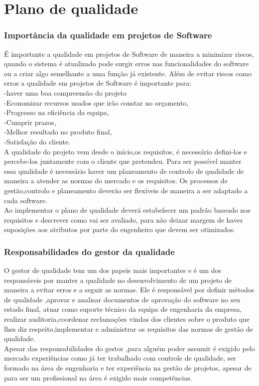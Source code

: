 \chapter{Plano de qualidade}
\label{plano_de_qualidade}

\subsection{Importância da qualidade em projetos de Software}
É importante a qualidade em projetos de Software de maneira a minimizar riscos, quando o sistema é atualizado pode surgir erros nas funcionalidades do software ou a criar algo semelhante a uma função já existente. Além de evitar riscos como erros a qualidade em projetos de Software é importante para:\\
-haver uma boa compreensão do projeto\\
-Economizar recursos usados que irão constar no orçamento,\\
-Progresso na eficiência da equipa,\\
-Cumprir prazos,\\
-Melhor resultado no produto final,\\
-Satisfação do cliente.\\
A qualidade do projeto vem desde o início,os requisitos, é necessário defini-los e percebe-los juntamente com o cliente que pretendeu. Para ser possível manter essa qualidade é necessário haver um planeamento de controlo de qualidade de maneira a atender as normas do mercado e os requisitos. Os processos de gestão,controlo e planeamento deverão ser flexíveis de maneira a ser adaptado a cada software.\\
Ao implementar o plano de qualidade deverá estabelecer um padrão baseado nos requisitos e descrever como vai ser avaliado, para não deixar margem de haver suposições aos atributos por parte do engenheiro que devem ser otimizados.
\subsection{Responsabilidades do gestor da qualidade}
O gestor de qualidade tem um dos papeis mais importantes e é um dos responsáveis por manter a qualidade no desenvolvimento de um projeto de maneira a evitar erros e a seguir as normas. Ele é responsável por definir métodos de qualidade ,aprovar e analisar documentos de aprovação do software no seu estado final, atuar como suporte técnico da equipa de engenharia da empresa, realizar auditoria,coordenar reclamações vindas dos clientes sobre o produto que lhes diz respeito,implementar e administrar os requisitos das normas de gestão de qualidade.\\
Apesar das responsabilidades do gestor ,para alguém poder assumir é exigido pelo mercado experiências como já ter trabalhado com controle de qualidade, ser formado na área de engenharia e ter experiência na gestão de projetos, apesar de para ser um profissional na área é exigido mais competências.
